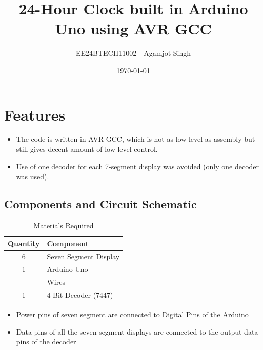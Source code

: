 \documentclass[a4paper,12pt]{article}
\title{24-Hour Clock built in Arduino Uno using AVR GCC}
\author{EE24BTECH11002 - Agamjot Singh}
\date{\today}
\begin{document}
\maketitle

\section*{Features}
\begin{itemize}
    \item The code is written in AVR GCC, which is not as low level as assembly but still gives decent amount of low level control.
    
    \item Use of one decoder for each 7-segment display was avoided (only one decoder was used).

\end{itemize}
\subsection*{Components and Circuit Schematic}

\begin{table}[H]
\centering
\begin{tabular}{|c|l|}
\hline
\textbf{Quantity} & \textbf{Component} \\
\hline
6 & Seven Segment Display \\
\hline
1 & Arduino Uno\\
\hline
- & Wires \\
\hline
1 & 4-Bit Decoder (7447) \\
\hline
\end{tabular}
\caption{Materials Required}
\label{tab:materials}
\end{table}

\begin{itemize}
    \item Power pins of seven segment are connected to Digital Pins of the Arduino
    \item Data pins of all the seven segment displays are connected to the output data pins of the decoder
\end{itemize}
\end{document}
